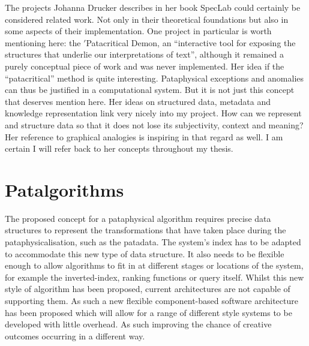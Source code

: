 The projects Johanna Drucker describes in her book SpecLab \autocite{Drucker2009}  could certainly be considered related work. Not only in their theoretical foundations but also in some aspects of their implementation. One project in particular is worth mentioning here: the $'$Patacritical Demon, an ``interactive tool for exposing the structures that underlie our interpretations of text'', although it remained a purely conceptual piece of work and was never implemented. Her idea if the ``patacritical'' method is quite interesting. Pataphysical exceptions and anomalies can thus be justified in a computational system. But it is not just this concept that deserves mention here.
Her ideas on structured data, metadata and knowledge representation link very nicely into my project. How can we represent and structure data so that it does not lose its subjectivity, context and meaning? Her reference to graphical analogies is inspiring in that regard as well. I am certain I will refer back to her concepts throughout my thesis.


\section{Patalgorithms}

The proposed concept for a pataphysical algorithm requires precise data structures to represent the transformations that have taken place during the pataphysicalisation, such as the patadata. The system’s index has to be adapted to accommodate this new type of data structure. It also needs to be flexible enough to allow algorithms to fit in at different stages or locations of the system, for example the inverted-index, ranking functions or query itself.
Whilst this new style of algorithm has been proposed, current architectures are not capable of supporting them. As such a new flexible component-based software architecture has been proposed which will allow for a range of different style systems to be developed with little overhead. As such improving the chance of creative outcomes occurring in a different way.

